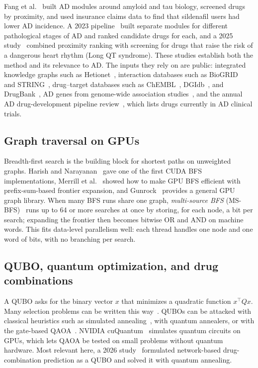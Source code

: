 Fang et al.~\cite{fang2021endophenotype} built AD modules around amyloid and tau biology, screened drugs by proximity, and used insurance claims data to find that sildenafil users had lower AD incidence. A 2023 pipeline~\cite{csbj2023proximity} built separate modules for different pathological stages of AD and ranked candidate drugs for each, and a 2025 study~\cite{lqt2025proximity} combined proximity ranking with screening for drugs that raise the risk of a dangerous heart rhythm (Long QT syndrome). These studies establish both the method and its relevance to AD. The inputs they rely on are public: integrated knowledge graphs such as Hetionet~\cite{himmelstein2017hetionet}, interaction databases such as BioGRID~\cite{oughtred2021biogrid} and STRING~\cite{szklarczyk2023string}, drug--target databases such as ChEMBL~\cite{zdrazil2024chembl}, DGIdb~\cite{freshour2021dgidb}, and DrugBank~\cite{knox2024drugbank}, AD genes from genome-wide association studies~\cite{bellenguez2022new}, and the annual AD drug-development pipeline review~\cite{cummings2024pipeline}, which lists drugs currently in AD clinical trials.

\subsection{Graph traversal on GPUs}

Breadth-first search is the building block for shortest paths on unweighted graphs. Harish and Narayanan~\cite{harish2007accelerating} gave one of the first CUDA BFS implementations, Merrill et al.~\cite{merrill2012scalable} showed how to make GPU BFS efficient with prefix-sum-based frontier expansion, and Gunrock~\cite{wang2016gunrock} provides a general GPU graph library. When many BFS runs share one graph, \emph{multi-source BFS} (MS-BFS)~\cite{then2014more} runs up to 64 or more searches at once by storing, for each node, a bit per search; expanding the frontier then becomes bitwise OR and AND on machine words. This fits data-level parallelism well: each
thread handles one node and one word of bits, with no branching per search.

\subsection{QUBO, quantum optimization, and drug combinations}

A QUBO asks for the binary vector $x$ that minimizes a quadratic function $x^{\top}Qx$. Many selection problems can be written this way~\cite{glover2019tutorial,lucas2014ising}. QUBOs can be attacked with classical heuristics such as simulated annealing~\cite{kirkpatrick1983optimization}, with quantum annealers, or with the gate-based QAOA~\cite{farhi2014qaoa}. NVIDIA cuQuantum~\cite{bayraktar2023cuquantum} simulates quantum circuits on GPUs, which lets QAOA be tested on small problems without quantum hardware. Most relevant here, a 2026 study~\cite{qmi2026combinations} formulated network-based drug-combination prediction as a QUBO and solved it with quantum annealing.

